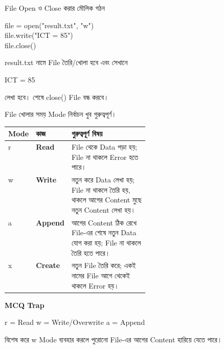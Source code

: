 \begin{codeoutputbox}{File Open ও Close করার মৌলিক গঠন}
\noindent
\begin{minipage}[t]{0.54\linewidth}
\vspace{0pt}
\codeheading
\begin{english}
\ttfamily
file = open("result.txt", "w")\\
file.write("ICT = 85")\\
file.close()
\end{english}
\end{minipage}
\hfill
\begin{minipage}[t]{0.42\linewidth}
\vspace{0pt}
\outputheading

\textenglish{\ttfamily result.txt} নামে File তৈরি/খোলা হবে এবং সেখানে

\begin{center}
\textenglish{\ttfamily ICT = 85}
\end{center}

লেখা হবে। শেষে \textenglish{\ttfamily close()} File বন্ধ করবে।
\end{minipage}
\end{codeoutputbox}



File খোলার সময় Mode নির্বাচন খুব গুরুত্বপূর্ণ।

\begin{tabularx}{\linewidth}{|C{0.12\linewidth}|>{\bfseries\RaggedRight\arraybackslash}p{0.20\linewidth}|Y|}
\hline
{}
\textbf{Mode} & \textbf{কাজ} & \textbf{গুরুত্বপূর্ণ বিষয়}\\
\hline
\textenglish{\ttfamily r} & Read & File থেকে Data পড়া হয়; File না থাকলে Error হতে পারে।\\
\hline
\textenglish{\ttfamily w} & Write & নতুন করে Data লেখা হয়; File না থাকলে তৈরি হয়, থাকলে আগের Content মুছে নতুন Content লেখা হয়।\\
\hline
\textenglish{\ttfamily a} & Append & আগের Content ঠিক রেখে File-এর শেষে নতুন Data যোগ করা হয়; File না থাকলে তৈরি হতে পারে।\\
\hline
\textenglish{\ttfamily x} & Create & নতুন File তৈরি করে; একই নামের File আগে থেকেই থাকলে Error হয়।\\
\hline
\end{tabularx}

\begin{rememberbox}
\textbf{\color{deepOrange}MCQ Trap}

\begin{center}
\textenglish{\ttfamily r} = Read
\qquad
\textenglish{\ttfamily w} = Write/Overwrite
\qquad
\textenglish{\ttfamily a} = Append
\end{center}

বিশেষ করে \textenglish{\ttfamily w} Mode ব্যবহার করলে পুরোনো File-এর
আগের Content হারিয়ে যেতে পারে।
\end{rememberbox}

